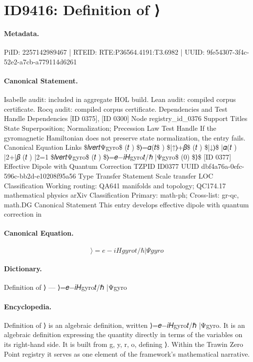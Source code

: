 \section*{ID9416: Definition of ⟩}
\paragraph{Metadata.}
PiID: 2257142989467 | RTEID: RTE:P36564.4191:T3.6982 | UUID: 9fe54307-3f4c-52e2-a7cb-a779114d6261

\paragraph{Canonical Statement.}
Isabelle audit: included in aggregate HOL build. Lean audit: compiled corpus certificate. Rocq audit: compiled corpus certificate. Dependencies and Test Handle Dependencies [ID 0375], [ID 0300] Node registry\_id\_0376 Support Titles State Superposition; Normalization; Precession Law Test Handle If the gyromagnetic Hamiltonian does not preserve state normalization, the entry fails. Canonical Equation Links \$𝑙𝑣𝑒𝑟𝑡Ψgyro\$ (𝑡 ) \$⟩=𝛼(𝑡\$ ) \$|↑⟩+𝛽\$ (𝑡 ) \$|↓⟩\$ |𝛼(𝑡 ) |2+|𝛽 (𝑡 ) |2=1 \$𝑙𝑣𝑒𝑟𝑡Ψgyro\$ (𝑡 ) \$⟩=𝑒−𝑖𝐻gyro𝑡/ℏ |Ψgyro\$ (0) \$⟩\$ [ID 0377] Effective Dipole with Quantum Correction TZPID ID0377 UUID dbf4a76a-0efc-596c-bb2d-e10208f95a56 Type Transfer Statement Scale transfer LOC Classification Working routing: QA641 manifolds and topology; QC174.17 mathematical physics arXiv Classification Primary: math-ph; Cross-list: gr-qc, math.DG Canonical Statement This entry develops effective dipole with quantum correction in

\paragraph{Canonical Equation.}
\[
⟩=𝑒−𝑖𝐻gyro𝑡/ℏ |Ψgyro
\]

\paragraph{Dictionary.}
Definition of ⟩ — ⟩=𝑒−𝑖𝐻gyro𝑡/ℏ |Ψgyro

\paragraph{Encyclopedia.}
Definition of ⟩ is an algebraic definition, written ⟩=𝑒−𝑖𝐻gyro𝑡/ℏ |Ψgyro. It is an algebraic definition expressing the quantity directly in terms of the variables on its right-hand side. It is built from g, y, r, o, defining ⟩. Within the Trawin Zero Point registry it serves as one element of the framework's mathematical narrative.
